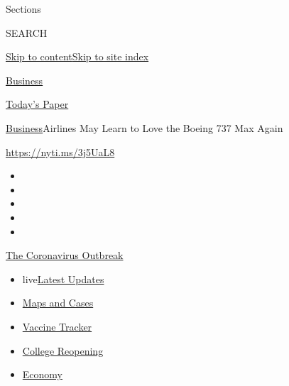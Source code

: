 Sections

SEARCH

\protect\hyperlink{site-content}{Skip to
content}\protect\hyperlink{site-index}{Skip to site index}

\href{https://www.nytimes3xbfgragh.onion/section/business}{Business}

\href{https://myaccount.nytimes3xbfgragh.onion/auth/login?response_type=cookie\&client_id=vi}{}

\href{https://www.nytimes3xbfgragh.onion/section/todayspaper}{Today's
Paper}

\href{/section/business}{Business}\textbar{}Airlines May Learn to Love
the Boeing 737 Max Again

\url{https://nyti.ms/3j5UaL8}

\begin{itemize}
\item
\item
\item
\item
\item
\end{itemize}

\href{https://www.nytimes3xbfgragh.onion/news-event/coronavirus?action=click\&pgtype=Article\&state=default\&region=TOP_BANNER\&context=storylines_menu}{The
Coronavirus Outbreak}

\begin{itemize}
\tightlist
\item
  live\href{https://www.nytimes3xbfgragh.onion/2020/08/03/world/coronavirus-covid-19.html?action=click\&pgtype=Article\&state=default\&region=TOP_BANNER\&context=storylines_menu}{Latest
  Updates}
\item
  \href{https://www.nytimes3xbfgragh.onion/interactive/2020/us/coronavirus-us-cases.html?action=click\&pgtype=Article\&state=default\&region=TOP_BANNER\&context=storylines_menu}{Maps
  and Cases}
\item
  \href{https://www.nytimes3xbfgragh.onion/interactive/2020/science/coronavirus-vaccine-tracker.html?action=click\&pgtype=Article\&state=default\&region=TOP_BANNER\&context=storylines_menu}{Vaccine
  Tracker}
\item
  \href{https://www.nytimes3xbfgragh.onion/2020/08/02/us/covid-college-reopening.html?action=click\&pgtype=Article\&state=default\&region=TOP_BANNER\&context=storylines_menu}{College
  Reopening}
\item
  \href{https://www.nytimes3xbfgragh.onion/live/2020/08/03/business/stock-market-today-coronavirus?action=click\&pgtype=Article\&state=default\&region=TOP_BANNER\&context=storylines_menu}{Economy}
\end{itemize}

